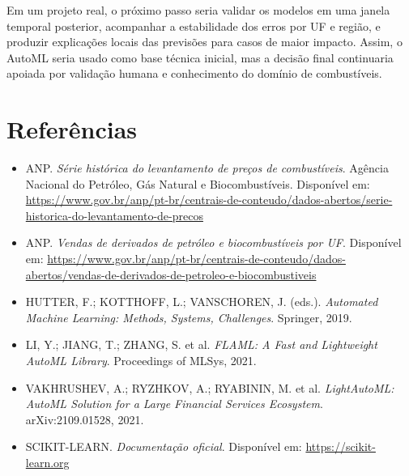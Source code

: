 \documentclass[11pt, a4paper, oneside]{article}
\begin{document}
Em um projeto real, o próximo passo seria validar os modelos em uma janela temporal
posterior, acompanhar a estabilidade dos erros por UF e região, e produzir explicações
locais das previsões para casos de maior impacto. Assim, o AutoML seria usado como
base técnica inicial, mas a decisão final continuaria apoiada por validação humana e
conhecimento do domínio de combustíveis.

\newpage
\section*{Referências}

\begin{itemize}[leftmargin=1.5cm, itemsep=4pt]
  \item ANP. \textit{Série histórica do levantamento de preços de combustíveis}. Agência Nacional do Petróleo, Gás Natural e Biocombustíveis. Disponível em: \url{https://www.gov.br/anp/pt-br/centrais-de-conteudo/dados-abertos/serie-historica-do-levantamento-de-precos}
  \item ANP. \textit{Vendas de derivados de petróleo e biocombustíveis por UF}. Disponível em: \url{https://www.gov.br/anp/pt-br/centrais-de-conteudo/dados-abertos/vendas-de-derivados-de-petroleo-e-biocombustiveis}
  \item HUTTER, F.; KOTTHOFF, L.; VANSCHOREN, J. (eds.). \textit{Automated Machine Learning: Methods, Systems, Challenges}. Springer, 2019.
  \item LI, Y.; JIANG, T.; ZHANG, S. et al. \textit{FLAML: A Fast and Lightweight AutoML Library}. Proceedings of MLSys, 2021.
  \item VAKHRUSHEV, A.; RYZHKOV, A.; RYABININ, M. et al. \textit{LightAutoML: AutoML Solution for a Large Financial Services Ecosystem}. arXiv:2109.01528, 2021.
  \item SCIKIT-LEARN. \textit{Documentação oficial}. Disponível em: \url{https://scikit-learn.org}
\end{itemize}
\end{document}
